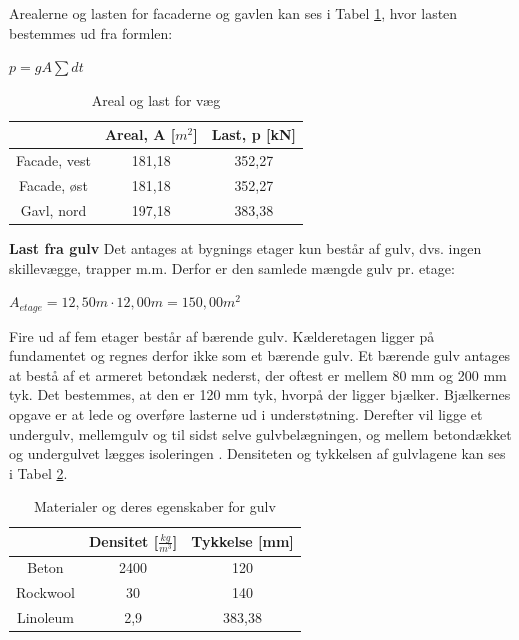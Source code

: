 Arealerne og lasten for facaderne og gavlen kan ses i Tabel \ref{tab:arealoglast}, hvor lasten bestemmes ud fra formlen:
\begin{center}
	$p = g A \sum dt$
\end{center}

\begin{table}
	\begin{center}
		\begin{tabular}{|c|c|c|}
			\hline
			& Areal, A [$m^2$]   & Last, p [kN]    \\ \hline
			Facade, vest & 181,18 & 352,27 \\ \hline
			Facade, øst  & 181,18 & 352,27 \\ \hline
			Gavl, nord   & 197,18 & 383,38 \\ \hline
		\end{tabular}
		\caption{Areal og last for væg}
		\label{tab:arealoglast}
	\end{center}
\end{table}

\textbf{Last fra gulv}
\newline
Det antages at bygnings etager kun består af gulv, dvs. ingen skillevægge, trapper m.m. Derfor er den samlede mængde gulv pr. etage: 

\begin{center}
$A_{etage} = 12,\!50 m\cdot 12,\!00 m = 150,\!00 m^2$
\end{center}

Fire ud af fem etager består af bærende gulv. Kælderetagen ligger på fundamentet og regnes derfor ikke som et bærende gulv. 
\newline \indent{     }  Et bærende gulv antages at bestå af et armeret betondæk nederst, der oftest er mellem 80 mm og 200 mm tyk. Det bestemmes, at den er 120 mm tyk, hvorpå der ligger bjælker. Bjælkernes opgave er at lede og overføre lasterne ud i understøtning. Derefter vil ligge et undergulv, mellemgulv og til sidst selve gulvbelægningen, og mellem betondækket og undergulvet lægges isoleringen \citep{Gulvopbygning}. Densiteten og tykkelsen af gulvlagene kan ses i Tabel \ref{tab:densi}.

\begin{table}
	\begin{center}
		\begin{tabular}{|c|c|c|}
			\hline
			& Densitet [$\frac{kg}{m^3}$] & Tykkelse [mm] \\ \hline
			Beton    & 2400     & 120      \\ \hline
			Rockwool & 30       & 140      \\ \hline
			Linoleum & 2,9      & 383,38  \\ \hline
		\end{tabular}
		\caption{Materialer og deres egenskaber for gulv}
		\label{tab:densi}
	\end{center}
\end{table}

